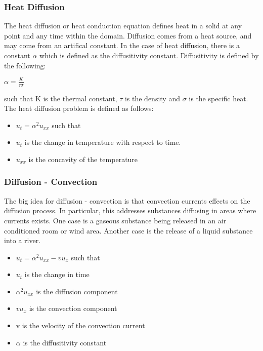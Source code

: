 \subsubsection {Heat Diffusion}

The heat diffusion or heat conduction equation defines heat in a solid at any point and any time within the domain.  Diffusion comes from a heat source, and may come from an artifical constant.  In the case of heat diffusion, there is a constant $\alpha$ which is defined as the diffusitivity constant.  Diffusitivity is defined by the following:

$\alpha = \frac{K}{\tau \sigma} $ 

such that K is the thermal constant, $\tau$ is the density and $\sigma$ is the specific heat.  The heat diffusion problem is defined as follows:


\begin{itemize}
\item $u_t = \alpha ^2 u_{xx} $ such that
\item $u_t$ is the change in temperature with respect to time.
\item $u_{xx}$ is the concavity of the temperature
\end{itemize}

\subsubsection {Diffusion - Convection }
The big idea for diffusion - convection is that %
convection currents effects on the diffusion process.  In particular, this addresses substances diffusing in areas where currents exists.  One case is a gaseous substance being released in an air conditioned room or wind area.  Another case is the release of a liquid substance into a river.



\begin{itemize}
\item $u_t = \alpha ^2 u_{xx} - vu_x $ such that
\item $u_t $ is the change in time
\item $\alpha ^2 u_{xx} $ is the diffusion component
\item $vu_x$ is the convection component
\item v is the velocity of the convection current
\item $\alpha$ is the diffusitivity constant
\end{itemize}

